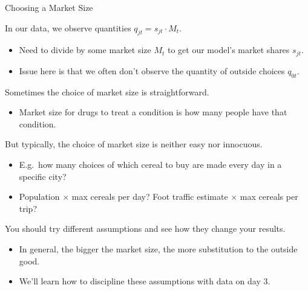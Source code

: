 \documentclass[aspectratio=169,t,11pt,table]{beamer}
\begin{document}
\begin{frame}{Choosing a Market Size}
    \begin{wideitemize}
        \item In our data, we observe quantities $q_{jt} = s_{jt} \cdot M_t$.
        \begin{itemize}
            \item Need to divide by some market size $M_t$ to get our model's market shares $s_{jt}$.
            \item Issue here is that we often don't observe the quantity of outside choices $q_{0t}$.
        \end{itemize}
        \pause
        \item Sometimes the choice of market size is straightforward.
        \begin{itemize}
            \item Market size for drugs to treat a condition is how many people have that condition.
        \end{itemize}
        \pause
        \item But typically, the choice of market size is \alert{neither easy nor innocuous}.
        \begin{itemize}
            \item E.g.\ how many choices of which cereal to buy are made every day in a specific city?
            \item Population $\times$ max cereals per day? Foot traffic estimate $\times$ max cereals per trip?
        \end{itemize}
        \pause
        \item You should try different assumptions and see how they change your results.
        \begin{itemize}
            \item In general, the bigger the market size, the more substitution to the outside good.
            \item We'll learn how to discipline these assumptions with data on day 3.
        \end{itemize}
    \end{wideitemize}
\end{frame}
\end{document}
